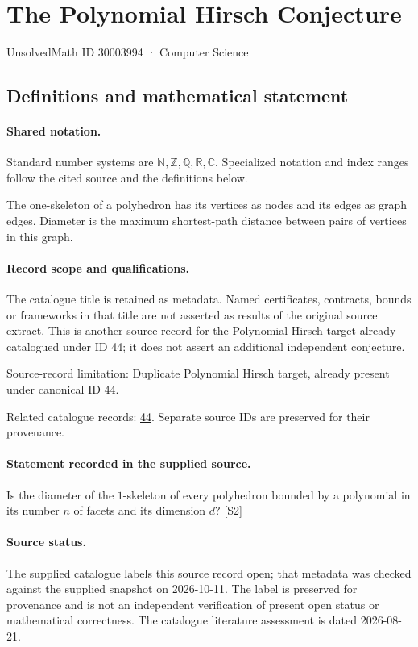 \documentclass[11pt]{article}
\newcommand{\sref}[2]{\hyperlink{source:#1:#2}{[S#2]}}
\begin{document}
\setcounter{section}{30003993}
\section{The Polynomial Hirsch Conjecture}\label{30003994}
{\small\sffamily UnsolvedMath ID 30003994 · Computer Science}
\subsection{Definitions and mathematical statement}

\paragraph{Shared notation.}Standard number systems are $\mathbb N,\mathbb Z,\mathbb Q,\mathbb R,\mathbb C$. Specialized notation and index ranges follow the cited source and the definitions below.


The one-skeleton of a polyhedron has its vertices as nodes and its edges as graph edges. Diameter is the maximum shortest-path distance between pairs of vertices in this graph.
\paragraph{Record scope and qualifications.}
The catalogue title is retained as metadata. Named certificates, contracts, bounds or frameworks in that title are not asserted as results of the original source extract.
This is another source record for the Polynomial Hirsch target already catalogued under ID 44; it does not assert an additional independent conjecture.

Source-record limitation: Duplicate Polynomial Hirsch target, already present under canonical ID 44.

Related catalogue records: \href{https://mehmetmars7.github.io/Erdosproblems-llm-hunter/problem.html?type=open_problems&id=44}{44}. Separate source IDs are preserved for their provenance.
\paragraph{Statement recorded in the supplied source.}
Is the diameter of the $1$-skeleton of every polyhedron bounded by a polynomial in its number $n$ of facets and its dimension $d$? \sref{30003994}{2}
\paragraph{Source status.}
The supplied catalogue labels this source record open; that metadata was checked against the supplied snapshot on 2026-10-11. The label is preserved for provenance and is not an independent verification of present open status or mathematical correctness. The catalogue literature assessment is dated 2026-08-21.
\end{document}
